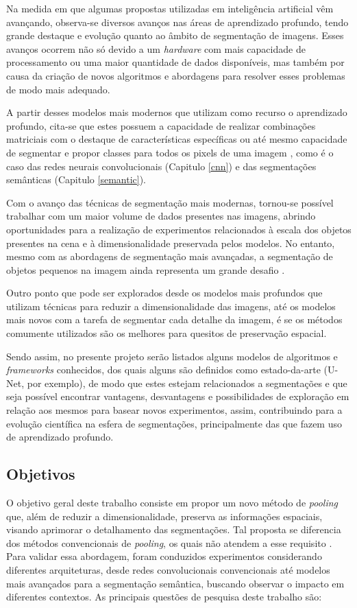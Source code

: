 Na medida em que algumas propostas utilizadas em inteligência artificial vêm avançando, observa-se diversos avanços nas áreas de aprendizado profundo, tendo grande destaque e evolução quanto ao âmbito de segmentação de imagens. Esses avanços ocorrem não só devido a um \textit{hardware} com mais capacidade de processamento ou uma maior quantidade de dados disponíveis, mas também por causa da criação de novos algoritmos e abordagens para resolver esses problemas \citep{Szegedy2015} de modo mais adequado.

A partir desses modelos mais modernos que utilizam como recurso o aprendizado profundo, cita-se que estes possuem a capacidade de realizar combinações matriciais com o destaque de características específicas ou até mesmo capacidade de segmentar e propor classes para todos os pixels de uma imagem \citep{Minaee2021}, como é o caso das redes neurais convolucionais (Capitulo \ref{cnn}) e das segmentações semânticas (Capitulo \ref{semantic}).

Com o avanço das técnicas de segmentação mais modernas, tornou-se possível trabalhar com um maior volume de dados presentes nas imagens, abrindo oportunidades para a realização de experimentos relacionados à escala dos objetos presentes na cena e à dimensionalidade preservada pelos modelos. No entanto, mesmo com as abordagens de segmentação mais avançadas, a segmentação de objetos pequenos na imagem ainda representa um grande desafio \citep{Sang2023Small-ObjectAttention, Su2021Small-scaleFusion}.

Outro ponto que pode ser explorados desde os modelos mais profundos que utilizam técnicas para reduzir a dimensionalidade das imagens, até os modelos mais novos com a tarefa de segmentar cada detalhe da imagem, é se os métodos comumente utilizados são os melhores para quesitos de preservação espacial.

Sendo assim, no presente projeto serão listados alguns modelos de algoritmos e \textit{frameworks} conhecidos, dos quais alguns são definidos como estado-da-arte (U-Net, por exemplo), de modo que estes estejam relacionados a segmentações e que seja possível encontrar vantagens, desvantagens e possibilidades de exploração em relação aos mesmos para basear novos experimentos, assim, contribuindo para a evolução científica na esfera de segmentações, principalmente das que fazem uso de aprendizado profundo.

\subsection{Objetivos}
\label{intro:objectives}
O objetivo geral deste trabalho consiste em propor um novo método de \textit{pooling} que, além de reduzir a dimensionalidade, preserva as informações espaciais, visando aprimorar o detalhamento das segmentações. Tal proposta se diferencia dos métodos convencionais de \textit{pooling}, os quais não atendem a esse requisito \citep{Liu2019Multi-LevelNetworks}. Para validar essa abordagem, foram conduzidos experimentos considerando diferentes arquiteturas, desde redes convolucionais convencionais até modelos mais avançados para a segmentação semântica, buscando observar o impacto em diferentes contextos. As principais questões de pesquisa deste trabalho são:

